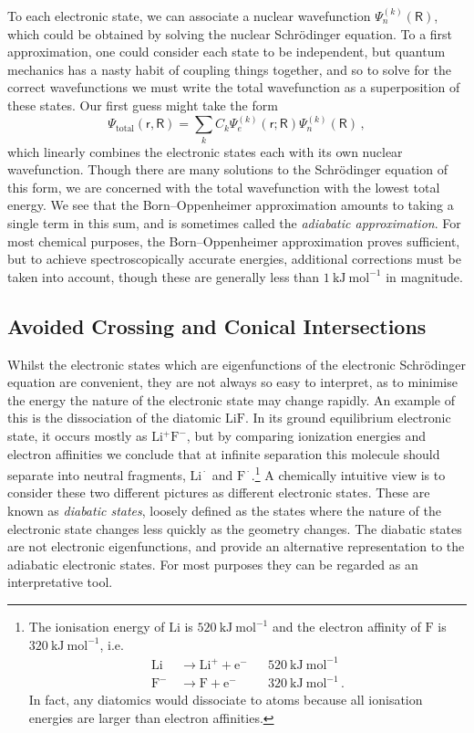 \documentclass{article}
\theoremstyle{plain}\theoremheaderfont{\normalfont\itshape}\theorembodyfont{\rmfamily}\theoremseparator{.}\newtheorem*{rem}{Remark}\newtheorem*{ex}{Example}\newtheorem*{proof}{Proof}\newtheorem*{altp}{Alternative proof}
\theoremstyle{plain}\theoremheaderfont{\normalfont\bfseries}\theorembodyfont{\rmfamily}\theoremseparator{.}\newtheorem{thm}{Theorem}[section]\newtheorem{lem}[thm]{Lemma}\newtheorem{prop}[thm]{Proposition}\newtheorem*{cor}{Corollary}\newtheorem{defn}[thm]{Definition}\newtheorem{clm}[thm]{Claim}\newtheorem{clminproof}{Claim}\newtheorem{pos}{Postulate}[section]
\theoremstyle{break}\theoremheaderfont{\normalfont\itshape}\theorembodyfont{\rmfamily}\theoremseparator{.\medskip}\newtheorem*{proofskip}{Proof}\newtheorem*{exs}{Examples}\newtheorem*{rems}{Remarks}
\theoremstyle{break}\theoremheaderfont{\normalfont\bfseries}\theorembodyfont{\rmfamily}\theoremseparator{.\medskip}\newtheorem{lemskip}[thm]{Lemma}\newtheorem{defnskip}[thm]{Definition}\newtheorem{propskip}[thm]{Proposition}\newtheorem{thmskip}[thm]{Theorem}
\numberwithin{equation}{section}
\newcommand{\unit}[1]{\ \mathrm{#1}}
\newcommand{\vdot}{\,\bm{\mathrm{\cdot}}\,}
\begin{document}
    To each electronic state, we can associate a nuclear wavefunction \(\Psi_n^{(k)}(\mathsf{R})\), which could be obtained by solving the nuclear Schr\"{o}dinger equation. To a first approximation, one could consider each state to be independent, but quantum mechanics has a nasty habit of coupling things together, and so to solve for the correct wavefunctions we must write the total wavefunction as a superposition of these states. Our first guess might take the form
    \begin{equation}
        \Psi_{\text{total}}(\mathsf{r},\mathsf{R})=\sum_k C_k\Psi_e^{(k)}(\mathsf{r};\mathsf{R})\Psi_n^{(k)}(\mathsf{R})\,,
    \end{equation}
    which linearly combines the electronic states each with its own nuclear wavefunction. Though there are many solutions to the Schr\"{o}dinger equation of this form, we are concerned with the total wavefunction with the lowest total energy. We see that the Born--Oppenheimer approximation amounts to taking a single term in this sum, and is sometimes called the \textit{adiabatic approximation}. For most chemical purposes, the Born--Oppenheimer approximation proves sufficient, but to achieve spectroscopically accurate energies, additional corrections must be taken into account, though these are generally less than \(1\unit{kJ}\unit{mol}^{-1}\) in magnitude.

    \subsection{Avoided Crossing and Conical Intersections}
    Whilst the electronic states which are eigenfunctions of the electronic Schr\"{o}dinger equation are convenient, they are not always so easy to interpret, as to minimise the energy the nature of the electronic state may change rapidly. An example of this is the dissociation of the diatomic \(\mathrm{LiF}\). In its ground equilibrium electronic state, it occurs mostly as \(\mathrm{Li^+ F^-}\), but by comparing ionization energies and electron affinities we conclude that at infinite separation this molecule should separate into neutral fragments, \(\mathrm{Li}^{\vdot}\) and \(\mathrm{F}^{\vdot}\).\footnote{The ionisation energy of \(\mathrm{Li}\) is \(520\unit{kJ}\unit{mol}^{-1}\) and the electron affinity of \(\mathrm{F}\) is \(320\unit{kJ}\unit{mol}^{-1}\), i.e.
    \begin{align*}
        \mathrm{Li}\,& \mathrm{\longrightarrow Li^+ + e^-} & &520\unit{kJ}\unit{mol}^{-1}\\
        \mathrm{F^-}\,& \mathrm{\longrightarrow F + e^-} & &320\unit{kJ}\unit{mol}^{-1}\,.
    \end{align*}
    In fact, any diatomics would dissociate to atoms because all ionisation energies are larger than electron affinities.} A chemically intuitive view is to consider these two different pictures as different electronic states. These are known as \textit{diabatic states}, loosely defined as the states where the nature of the electronic state changes less quickly as the geometry changes. The diabatic states are not electronic eigenfunctions, and provide an alternative representation to the adiabatic electronic states. For most purposes they can be regarded as an interpretative tool.
\end{document}
